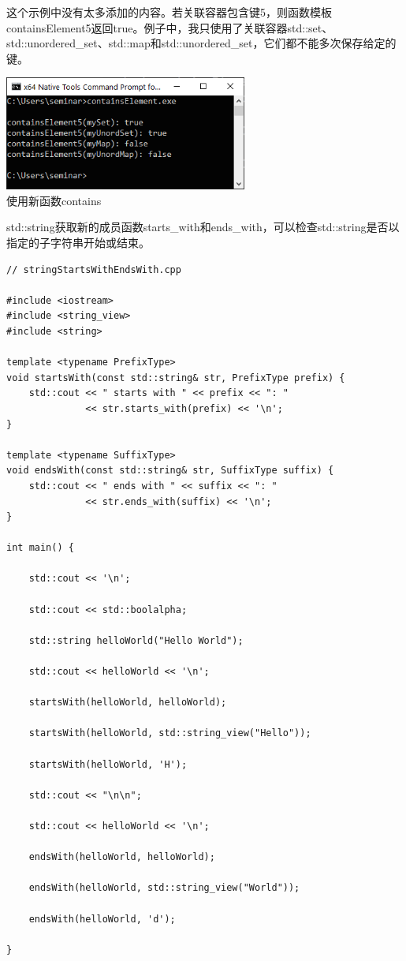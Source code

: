 这个示例中没有太多添加的内容。若关联容器包含键5，则函数模板containsElement5返回true。例子中，我只使用了关联容器std::set、std::unordered\_set、std::map和std::unordered\_set，它们都不能多次保存给定的键。

\begin{center}
\includegraphics[width=0.6\textwidth]{content/3/chapter5/images/14.png}\\
使用新函数contains
\end{center}


std::string获取新的成员函数starts\_with和ends\_with，可以检查std::string是否以指定的子字符串开始或结束。

\begin{lstlisting}[style=styleCXX]
// stringStartsWithEndsWith.cpp

#include <iostream>
#include <string_view>
#include <string>

template <typename PrefixType>
void startsWith(const std::string& str, PrefixType prefix) {
	std::cout << " starts with " << prefix << ": "
			  << str.starts_with(prefix) << '\n';
}

template <typename SuffixType>
void endsWith(const std::string& str, SuffixType suffix) {
	std::cout << " ends with " << suffix << ": "
			  << str.ends_with(suffix) << '\n';
}

int main() {

	std::cout << '\n';
	
	std::cout << std::boolalpha;
	
	std::string helloWorld("Hello World");
	
	std::cout << helloWorld << '\n';
	
	startsWith(helloWorld, helloWorld);
	
	startsWith(helloWorld, std::string_view("Hello"));
	
	startsWith(helloWorld, 'H');
	
	std::cout << "\n\n";
	
	std::cout << helloWorld << '\n';
	
	endsWith(helloWorld, helloWorld);
	
	endsWith(helloWorld, std::string_view("World"));
	
	endsWith(helloWorld, 'd');

}
\end{lstlisting}

